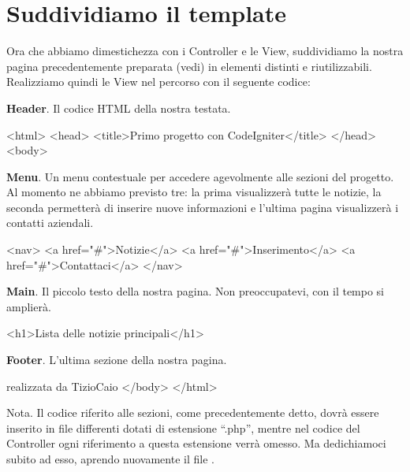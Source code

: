 \section*{Suddividiamo il template}
Ora che abbiamo dimestichezza con i Controller e le View, suddividiamo la nostra pagina precedentemente preparata (vedi) in elementi distinti e riutilizzabili. Realizziamo quindi le View nel percorso  con il seguente codice:

\textbf{Header}. Il codice \ac{HTML} della nostra testata.

\begin{html}
<html>
<head>
<title>Primo progetto con CodeIgniter</title>
</head>
<body>
\end{html}

\textbf{Menu}. Un menu contestuale per accedere agevolmente alle sezioni del progetto. Al momento ne abbiamo previsto tre: la prima visualizzerà tutte le notizie, la seconda permetterà di inserire nuove informazioni e l'ultima pagina visualizzerà i contatti aziendali.

\begin{html}
<nav>
	<a href="#">Notizie</a>
	<a href="#">Inserimento</a>
	<a href="#">Contattaci</a>
</nav>
\end{html}

\textbf{Main}. Il piccolo testo della nostra pagina. Non preoccupatevi, con il tempo si amplierà.

\begin{html}
<h1>Lista delle notizie principali</h1>
\end{html}

\textbf{Footer}. L'ultima sezione della nostra pagina.

\begin{code}
realizzata da TizioCaio
</body>
</html>
\end{code}

Nota. Il codice riferito alle sezioni, come precedentemente detto, dovrà essere inserito in file differenti dotati di estensione ``.php'', mentre nel codice del Controller ogni riferimento a questa estensione verrà omesso. Ma dedichiamoci subito ad esso, aprendo nuovamente il file .


